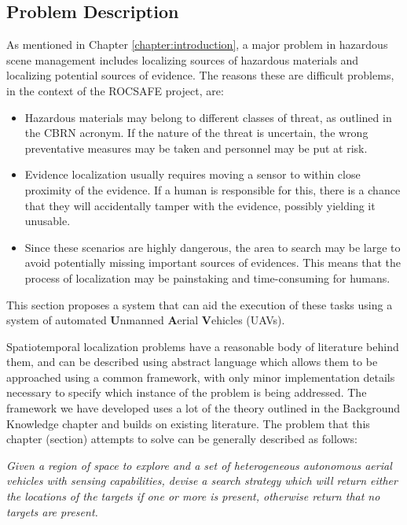 \subsection{Problem Description}
As mentioned in Chapter \ref{chapter:introduction}, a major problem in hazardous scene management includes localizing sources of hazardous materials and localizing potential sources of evidence. The reasons these are difficult problems, in the context of the ROCSAFE project, are:
\begin{itemize}
    \item Hazardous materials may belong to different classes of threat, as outlined in the CBRN acronym. If the nature of the threat is uncertain, the wrong preventative measures may be taken and personnel may be put at risk. 
    \item Evidence localization usually requires moving a sensor to within close proximity of the evidence. If a human is responsible for this, there is a chance that they will accidentally tamper with the evidence, possibly yielding it unusable.
    \item Since these scenarios are highly dangerous, the area to search may be large to avoid potentially missing important sources of evidences. This means that the process of localization may be painstaking and time-consuming for humans.
\end{itemize}
This section proposes a system that can aid the execution of these tasks using a system of automated \textbf{U}nmanned \textbf{A}erial \textbf{V}ehicles (UAVs). \par



Spatiotemporal localization problems have a reasonable body of literature behind them, and can be described using abstract language which allows them to be approached using a common framework, with only minor implementation details necessary to specify which instance of the problem is being addressed. The framework we have developed uses a lot of the theory outlined in the Background Knowledge chapter and builds on existing literature. The problem that this chapter (section) attempts to solve can be generally described as follows: \par

\textit{Given a region of space to explore and a set of heterogeneous autonomous aerial vehicles with sensing capabilities, devise a search strategy which will return either the locations of the targets if one or more is present, otherwise return that no targets are present.} \par

